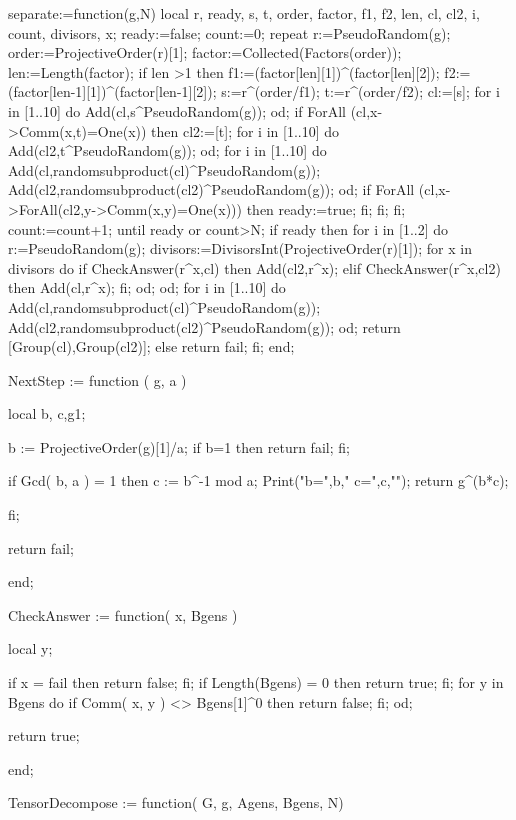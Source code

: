 separate:=function(g,N)
local r, ready, s, t, order, factor, f1, f2, len, cl, cl2, i, count, divisors, x;
ready:=false;
count:=0;
repeat
   r:=PseudoRandom(g);
   order:=ProjectiveOrder(r)[1];
   factor:=Collected(Factors(order));
   len:=Length(factor);
   if len >1 then
      f1:=(factor[len][1])^(factor[len][2]);
      f2:=(factor[len-1][1])^(factor[len-1][2]);
      s:=r^(order/f1);
      t:=r^(order/f2);
      cl:=[s];
      for i in [1..10] do
        Add(cl,s^PseudoRandom(g));
      od;
      if ForAll (cl,x->Comm(x,t)=One(x)) then
         cl2:=[t];
         for i in [1..10] do
            Add(cl2,t^PseudoRandom(g));
         od;
         for i in [1..10] do
           Add(cl,randomsubproduct(cl)^PseudoRandom(g));
           Add(cl2,randomsubproduct(cl2)^PseudoRandom(g));
         od;
         if ForAll (cl,x->ForAll(cl2,y->Comm(x,y)=One(x))) then
            ready:=true;
         fi;
       fi;
   fi;
   count:=count+1;
until ready or count>N;
if ready then
   for i in [1..2] do
       r:=PseudoRandom(g);
       divisors:=DivisorsInt(ProjectiveOrder(r)[1]);
       for x in divisors do
           if CheckAnswer(r^x,cl) then
              Add(cl2,r^x);
           elif CheckAnswer(r^x,cl2) then
              Add(cl,r^x);
           fi;
       od;
   od;
   for i in [1..10] do
       Add(cl,randomsubproduct(cl)^PseudoRandom(g));
       Add(cl2,randomsubproduct(cl2)^PseudoRandom(g));
   od;
   return [Group(cl),Group(cl2)];
else
   return fail;
fi;
end;


NextStep := function ( g, a )

	 local b, c,g1;

	 b := ProjectiveOrder(g)[1]/a;
         if b=1 then return fail; fi;

	 if Gcd( b, a ) = 1 then
	    c := b^-1 mod a;
Print("b=",b,"  c=",c,"\n");
            return g^(b*c);

         fi;

	 return fail;

end;


CheckAnswer := function( x, Bgens )

	    local y;

	    if x = fail then return false; fi;
	    if Length(Bgens) = 0 then return true; fi;
	    for y in Bgens do
	    	if Comm( x, y ) <> Bgens[1]^0 then
		   return false;
                fi;
	    od;

	    return true;

end;


TensorDecompose := function( G, g, Agens, Bgens, N)



